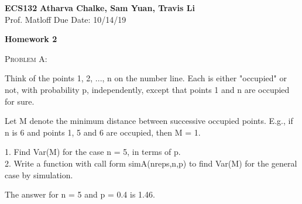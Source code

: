 \documentclass[12pt]{article}
\newenvironment{statement}[1]
{\begin{mdframed}[linewidth=0.6pt]
        \textsc{ #1:}

}
    {\end{mdframed}}
\begin{document}
\noindent
\textbf{ECS132} \hfill \textbf{Atharva Chalke, Sam Yuan, Travis Li} \\
\normalsize Prof. Matloff \hfill Due Date: 10/14/19 \\


\begin{center}
\textbf{Homework 2}
\end{center}

\begin{statement}{Problem A}
Think of the points 1, 2, ..., n on the number line. Each is either "occupied" or not, with probability p, independently, except that points 1 and n are occupied for sure.

Let M denote the minimum distance between successive occupied points. E.g., if n is 6 and points 1, 5 and 6 are occupied, then M = 1.

1. Find Var(M) for the case n = 5, in terms of p.\\
2. Write a function with call form
simA(nreps,n,p)
to find Var(M) for the general case by simulation.

The answer for n = 5 and p = 0.4 is 1.46.
\end{statement}

\end{document}
